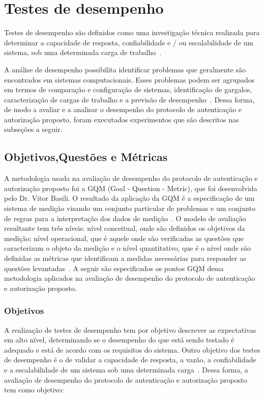 \section{Testes de desempenho}
Testes de desempenho são definidos como uma investigação técnica realizada para determinar a capacidade de resposta, confiabilidade e / ou escalabilidade de um sistema, sob uma determinada carga de trabalho~\cite{Meier2007}.

A análise de desempenho possibilita identificar problemas que geralmente são encontrados em sistemas computacionais. Esses problemas podem ser agrupados em termos de comparação e configuração de sistemas, identificação de gargalos, caracterização de cargas de trabalho e a previsão de desempenho~\cite{jain1991art}. Dessa forma, de modo a avaliar e a analisar o desempenho do protocolo de autenticação e autorização proposto, foram executados experimentos que são descritos nas subseções a seguir.

\subsection{Objetivos,Questões e Métricas}\label{sec:gqm}

A metodologia usada na avaliação de desempenho do protocolo de autenticação e autorização proposto foi a GQM (Goal - Question - Metric), que foi desenvolvida pelo Dr. Vitor Basili. O resultado da aplicação da GQM é a especificação de um sistema de medição visando um conjunto particular de problemas e um conjunto de regras para a interpretação dos dados de medição~\cite{gqm}.  O modelo de avaliação resultante tem três níveis: nível conceitual, onde  são definidos os objetivos da medição; nível operacional, que é aquele onde são verificadas as questões  que caracterizam o objeto da medição e o nível quantitativo, que é o nível onde são definidas as métricas que identificam a medidas necessárias para responder as questões levantadas~\cite{gqm}. A seguir são especificados os pontos GQM dessa metodologia aplicados na avaliação de desempenho do protocolo de autenticação e autorização proposto.

\subsubsection{Objetivos }\label{sec:gqmobjetivos}

A realização de testes de desempenho tem por objetivo descrever as expectativas em alto nível, determinando  se o desempenho do que está sendo testado é adequado e está de acordo com os requisitos do sistema. Outro objetivo dos testes de desempenho é o de validar a capacidade de resposta, a vazão, a confiabilidade e a escalabilidade de um sistema sob uma determinada carga~\cite{Meier2007}. Dessa forma, a avaliação de desempenho do protocolo de autenticação e autorização proposto tem como objetivo:

